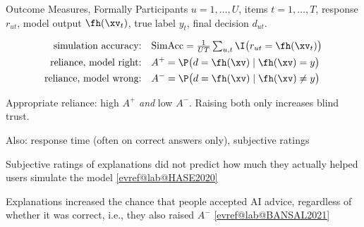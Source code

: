 \documentclass[10pt,compress,t,notes=noshow, xcolor=table, handout]{beamer}
\makeatletter
\newcommand{\citeref}[1]{%
  \href{\csname evref@url@#1\endcsname}{[\csname evref@lab@#1\endcsname]}}
\makeatother
\begin{document}
\begin{framev}[align=mid]{Outcome Measures, Formally}
Participants $u = 1,\dots,U$, items $t = 1,\dots,T$, response $r_{ut}$, model output $\fh(\xv_t)$, true label $y_t$, final decision $d_{ut}$.
\begin{definition}
\vspace{-0.4em}
\begin{align*}
\text{simulation accuracy:} \quad & \mathrm{SimAcc} = \tfrac{1}{UT}\textstyle\sum_{u,t}\I\big(r_{ut} = \fh(\xv_t)\big)\\
\text{reliance, model right:} \quad & A^+ = \P\big(d = \fh(\xv) \mid \fh(\xv) = y\big)\\
\text{reliance, model wrong:} \quad & A^- = \P\big(d = \fh(\xv) \mid \fh(\xv) \neq y\big)
\end{align*}
\end{definition}
\begin{itemizeS}
\item Appropriate reliance: high $A^+$ \emph{and} low $A^-$. Raising both only increases blind trust.
\item Also: response time (often on correct answers only), subjective ratings
\end{itemizeS}
\pause
\begin{itemizeS}
\item Subjective ratings of explanations did not predict how much they actually helped users simulate the model \citeref{HASE2020}
\item Explanations increased the chance that people accepted AI advice, regardless of whether it was correct, i.e., they also raised $A^-$ \citeref{BANSAL2021}
\end{itemizeS}
\end{framev}
\end{document}
